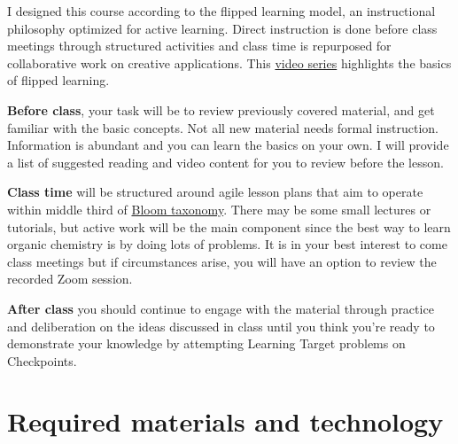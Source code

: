 I designed this course according to the flipped learning model, an
instructional philosophy optimized for active learning. Direct
instruction is done before class meetings through structured activities
and class time is repurposed for collaborative work on creative
applications. This \href{https://vimeo.com/showcase/8484250}{video
series} highlights the basics of flipped learning.

\textbf{Before class}, your task will be to review previously covered
material, and get familiar with the basic concepts. Not all new material
needs formal instruction. Information is abundant and you can learn the
basics on your own. I will provide a list of suggested reading and video
content for you to review before the lesson.

\textbf{Class time} will be structured around agile lesson plans that
aim to operate within middle third of
\href{https://flic.kr/p/LQuqT2}{Bloom taxonomy}. There may be some small
lectures or tutorials, but active work will be the main component since
the best way to learn organic chemistry is by doing lots of problems. It
is in your best interest to come class meetings but if circumstances
arise, you will have an option to review the recorded Zoom session.

\textbf{After class} you should continue to engage with the material
through practice and deliberation on the ideas discussed in class until
you think you're ready to demonstrate your knowledge by attempting
Learning Target problems on Checkpoints.

\hypertarget{required-materials-and-technology}{%
\section{Required materials and
technology}\label{required-materials-and-technology}}


